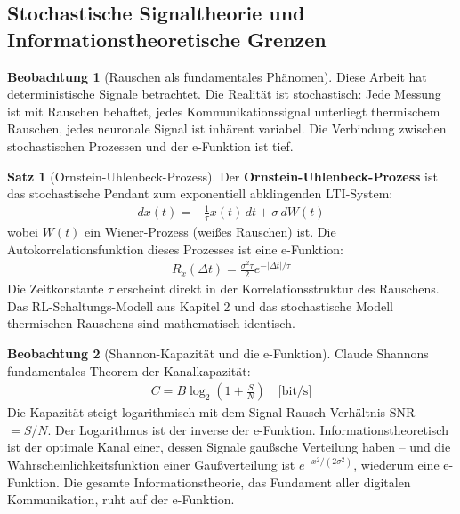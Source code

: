 ﻿\documentclass[a4paper,12pt]{report}
\theoremstyle{definition}
\newtheorem{satz}{Satz}
\newtheorem{beobachtung}{Beobachtung}
\begin{document}
	\subsection{Stochastische Signaltheorie und Informationstheoretische Grenzen}
	
	\begin{beobachtung}[Rauschen als fundamentales Phänomen]
		Diese Arbeit hat deterministische Signale betrachtet. Die Realität ist stochastisch: Jede Messung ist mit Rauschen behaftet, jedes Kommunikationssignal unterliegt thermischem Rauschen, jedes neuronale Signal ist inhärent variabel. Die Verbindung zwischen stochastischen Prozessen und der e-Funktion ist tief.
	\end{beobachtung}
	
	\begin{satz}[Ornstein-Uhlenbeck-Prozess]
		Der \textbf{Ornstein-Uhlenbeck-Prozess} ist das stochastische Pendant zum exponentiell abklingenden LTI-System:
		\begin{align}
			dx(t) = -\frac{1}{\tau} x(t)\, dt + \sigma\, dW(t)
		\end{align}
		wobei $W(t)$ ein Wiener-Prozess (weißes Rauschen) ist. Die Autokorrelationsfunktion dieses Prozesses ist eine e-Funktion:
		\begin{align}
			R_x(\Delta t) = \frac{\sigma^2 \tau}{2} e^{-|\Delta t|/\tau}
		\end{align}
		Die Zeitkonstante $\tau$ erscheint direkt in der Korrelationsstruktur des Rauschens. Das RL-Schaltungs-Modell aus Kapitel 2 und das stochastische Modell thermischen Rauschens sind mathematisch identisch.
	\end{satz}
	
	\begin{beobachtung}[Shannon-Kapazität und die e-Funktion]
		Claude Shannons fundamentales Theorem der Kanalkapazität:
		\begin{align}
			C = B \log_2\left(1 + \frac{S}{N}\right) \quad \text{[bit/s]}
		\end{align}
		Die Kapazität steigt logarithmisch mit dem Signal-Rausch-Verhältnis SNR $= S/N$. Der Logarithmus ist der inverse der e-Funktion. Informationstheoretisch ist der optimale Kanal einer, dessen Signale gaußsche Verteilung haben -- und die Wahrscheinlichkeitsfunktion einer Gaußverteilung ist $e^{-x^2/(2\sigma^2)}$, wiederum eine e-Funktion. Die gesamte Informationstheorie, das Fundament aller digitalen Kommunikation, ruht auf der e-Funktion.
	\end{beobachtung}
	
\end{document}
